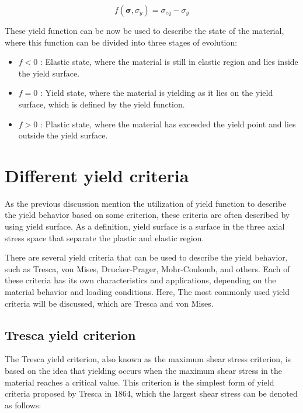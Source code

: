 \documentclass[12pt]{article}
\begin{document}
\begin{equation}
    f(\boldsymbol{\sigma}, \sigma_y) = \sigma_{eq} - \sigma_y
\end{equation}

These yield function can be now be used to describe the state of the material,
where this function can be divided into three stages of evolution:
\begin{itemize}
    \item $f < 0$ : Elastic state, where the material is still in elastic region and lies inside the yield surface.
    \item $f = 0$ : Yield state, where the material is yielding as it lies on the yield surface, which is defined by the yield function.
    \item $f > 0$ : Plastic state, where the material has exceeded the yield point and lies outside the yield surface. 
\end{itemize}


\section{Different yield criteria}
\hspace{2em}As the previous discussion mention the utilization of yield function to describe the yield behavior based on some 
criterion, these criteria are often described by using yield surface. As a definition, yield surface
is a surface in the three axial stress space that separate the plastic and elastic region.

\hspace{2em}There are several yield criteria that can be used to describe the
yield behavior, such as Tresca, von Mises, Drucker-Prager, Mohr-Coulomb, and others. Each of these criteria has its own
characteristics and applications, depending on the material behavior and loading conditions. Here, The most commonly used yield
criteria will be discussed, which are Tresca and von Mises.
\subsection{Tresca yield criterion}
\hspace{2em}The Tresca yield criterion, also known as the maximum shear stress criterion, is based on the idea that
yielding occurs when the maximum shear stress in the material reaches a critical value.
This criterion is the simplest form of yield criteria proposed by Tresca in 1864, which the largest shear stress can be denoted 
as follows:
\end{document}
